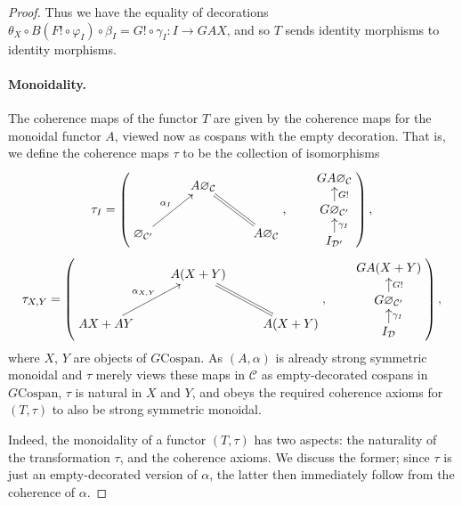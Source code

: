 \begin{proof}
Thus we have the equality of decorations $\theta_X \circ B(F! \circ \varphi_I)
\circ \beta_I = G! \circ \gamma_I\colon  I \to GAX$, and so $T$ sends identity
morphisms to identity morphisms.

\paragraph{Monoidality.} The coherence maps of the functor $T$ are given by the
coherence maps for the monoidal functor $A$, viewed now as cospans with the
empty decoration. That is, we define the coherence maps $\tau$ to be the
collection of isomorphisms
\[
  \tau_I = 
  \left(
  \begin{aligned}
    \xymatrix{
      & A\varnothing_{\mathcal C} \\  
      \varnothing_{\mathcal C'} \ar[ur]^{\alpha_I} && A\varnothing_{\mathcal
      C} \ar@{=}[ul]
    }
  \end{aligned}
  ,
  \qquad
  \begin{aligned}
    \xymatrixrowsep{.9pc}
    \xymatrix{
      GA\varnothing_{\mathcal C} \\
      G\varnothing_{\mathcal C'} \ar[u]_{G!} \\
      I_{\mathcal D'} \ar[u]_{\gamma_I}
    }
  \end{aligned}
  \right),
\]
\[
  \tau_{X,Y}=
  \left(
  \begin{aligned}
    \xymatrix{
      & A(X+Y) \\  
      AX+AY \ar[ur]^{\alpha_{X,Y}} && A(X+Y) \ar@{=}[ul]
    }
  \end{aligned}
  ,
  \qquad
  \begin{aligned}
    \xymatrixrowsep{.9pc}
    \xymatrix{
      GA(X+Y) \\
      G\varnothing_{\mathcal C'} \ar[u]_{G!} \\
      I_{\mathcal D} \ar[u]_{\gamma_I}
    }
  \end{aligned}
  \right),
\]
where $X$, $Y$ are objects of $G\mathrm{Cospan}$. As $(A,\alpha)$ is already
strong symmetric monoidal and $\tau$ merely views these maps in $\mathcal C$
as empty-decorated cospans in $G\mathrm{Cospan}$, $\tau$ is natural in $X$ and
$Y$, and obeys the required coherence axioms for $(T,\tau)$ to also be strong
symmetric monoidal. 

Indeed, the monoidality of a functor $(T,\tau)$ has two aspects: the naturality
of the transformation $\tau$, and the coherence axioms. We discuss the former;
since $\tau$ is just an empty-decorated version of $\alpha$, the latter then
immediately follow from the coherence of $\alpha$.


\end{proof}
